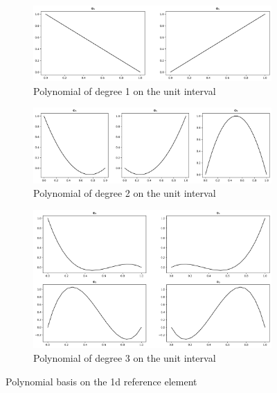 \documentclass[11pt,a4paper]{article}
\begin{document}
\begin{figure}
  \centering
  \begin{subfigure}{1.\textwidth}
    \centering
    \includegraphics[width=.8\linewidth]{p1_mesh_basis}
    \caption{Polynomial of degree 1 on the unit interval}
  \end{subfigure}
  \begin{subfigure}{1.\textwidth}
    \centering
    \includegraphics[width=.8\linewidth]{p2_mesh_basis}
    \caption{Polynomial of degree 2 on the unit interval}
  \end{subfigure}
  \begin{subfigure}{1.\textwidth}
    \centering
    \includegraphics[width=.8\linewidth]{p3_mesh_basis}
    \caption{Polynomial of degree 3 on the unit interval}
  \end{subfigure}
  \caption{Polynomial basis on the 1d reference element}
  \label{fig:basis_1d}
\end{figure}
\end{document}
